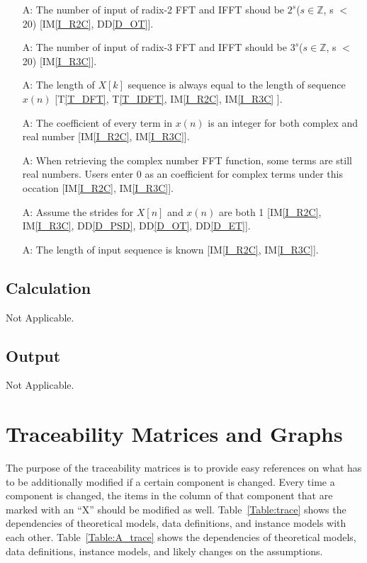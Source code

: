 \documentclass[12pt]{article}
\newcommand{\ddref}[1]{DD\ref{#1}}
\newcommand{\tref}[1]{T\ref{#1}}
\newcounter{assumpnum} %
\newcommand{\iref}[1]{IM\ref{#1}}
\begin{document}
\begin{itemize}

\item[A\refstepcounter{assumpnum}\theassumpnum \label{A_N2}:]
The number of  input of radix-2 FFT and IFFT shoud be $2^s$($s\in\mathbb{Z}$, s $<$ 20) [\iref{I_R2C}, \ddref{D_OT}].
\item[A\refstepcounter{assumpnum}\theassumpnum \label{A_N3}:]
The number of input of radix-3 FFT and IFFT should be $3^s$($s\in\mathbb{Z}$, s $<$ 20) [\iref{I_R3C}].
\item[A\refstepcounter{assumpnum}\theassumpnum \label{A_Equal}:]
The length of $X[k]$ sequence is always equal to the length of sequence $x(n)$  [\tref{T_DFT}, \tref{T_IDFT}, \iref{I_R2C}, \iref{I_R3C} ].
\item[A\refstepcounter{assumpnum}\theassumpnum \label{A_CoI}:]
The coefficient of every term in $x(n)$ is an integer for both complex and real number  [\iref{I_R2C}, \iref{I_R3C}].
\item[A\refstepcounter{assumpnum}\theassumpnum \label{A_C0}:]
When retrieving the complex number FFT function, some terms are still real numbers. Users enter 0 as an coefficient for complex terms under this occation [\iref{I_R2C}, \iref{I_R3C}].
\item[A\refstepcounter{assumpnum}\theassumpnum \label{A_Stride}:]
Assume the strides for ${X}[n]$ and ${x}(n)$ are both 1 [\iref{I_R2C}, \iref{I_R3C},  \ddref{D_PSD}, \ddref{D_OT}, \ddref{D_ET}].
\item[A\refstepcounter{assumpnum}\theassumpnum \label{A_Length}:]
The length of input sequence is known [\iref{I_R2C}, \iref{I_R3C}].


\end{itemize}

\subsection{Calculation} \label{sec_Calculation}
Not Applicable. 
\subsection{Output} \label{sec_Output}    
Not Applicable.



\section{Traceability Matrices and Graphs}
The purpose of the traceability matrices is to provide easy references on what has to be additionally modified if a certain component is changed.  Every time a 
component is changed, the items in the column of that component that are 
marked with an ``X'' should be modified as well.  Table~\ref{Table:trace}
shows the dependencies of theoretical models, data
definitions, and instance models with each other.
 Table~\ref{Table:A_trace} shows the dependencies of theoretical models, data definitions,  instance models, and likely changes on the assumptions.
\end{document}
